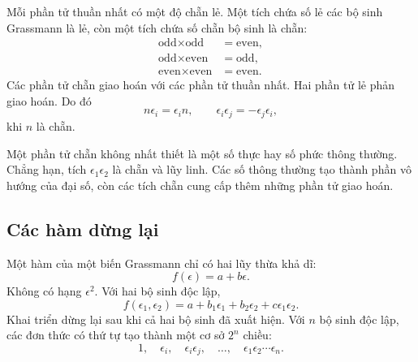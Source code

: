 Mỗi phần tử thuần nhất có một độ chẵn lẻ. Một tích chứa số lẻ các bộ sinh Grassmann là lẻ, còn một tích chứa số chẵn bộ sinh là chẵn:
\begin{align}
\text{odd}\times\text{odd}&=\text{even},\\
\text{odd}\times\text{even}&=\text{odd},\\
\text{even}\times\text{even}&=\text{even}.
\end{align}
Các phần tử chẵn giao hoán với các phần tử thuần nhất. Hai phần tử lẻ phản giao hoán. Do đó
\begin{equation}
n\epsilon_i=\epsilon_i n,
\qquad
\epsilon_i\epsilon_j=-\epsilon_j\epsilon_i,
\end{equation}
khi \(n\) là chẵn.

Một phần tử chẵn không nhất thiết là một số thực hay số phức thông thường. Chẳng hạn, tích \(\epsilon_1\epsilon_2\) là chẵn và lũy linh. Các số thông thường tạo thành phần vô hướng của đại số, còn các tích chẵn cung cấp thêm những phần tử giao hoán.

\begin{classroomqa}
\end{classroomqa}

\subsection{Các hàm dừng lại}

Một hàm của một biến Grassmann chỉ có hai lũy thừa khả dĩ:
\begin{equation}
f(\epsilon)=a+b\epsilon.
\end{equation}
Không có hạng \(\epsilon^2\). Với hai bộ sinh độc lập,
\begin{equation}
f(\epsilon_1,\epsilon_2)
=a+b_1\epsilon_1+b_2\epsilon_2+c\epsilon_1\epsilon_2.
\end{equation}
Khai triển dừng lại sau khi cả hai bộ sinh đã xuất hiện. Với \(n\) bộ sinh độc lập, các đơn thức có thứ tự tạo thành một cơ sở \(2^n\) chiều:
\begin{equation}
1,\quad
\epsilon_i,\quad
\epsilon_i\epsilon_j,\quad
\ldots,\quad
\epsilon_1\epsilon_2\cdots\epsilon_n.
\end{equation}

